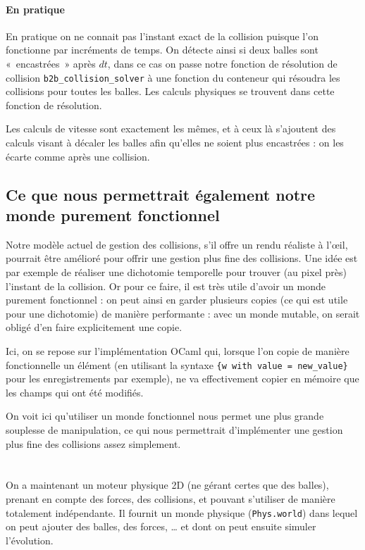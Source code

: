 \documentclass[a4paper]{scrartcl}
\begin{document}
\paragraph{En pratique}

En pratique on ne connait pas l'instant exact de la collision puisque
l'on fonctionne par incréments de temps. On détecte ainsi si deux
balles sont «~encastrées~» après $dt$, dans ce cas on passe notre
fonction de résolution de collision \texttt{b2b\_collision\_solver} à
une fonction du conteneur qui résoudra les collisions pour toutes les
balles. Les calculs physiques se trouvent dans cette fonction de
résolution.

Les calculs de vitesse sont exactement les mêmes, et à ceux là
s'ajoutent des calculs visant à décaler les balles afin qu'elles ne
soient plus encastrées : on les écarte comme après une collision.

\subsection{Ce que nous permettrait également notre monde purement
  fonctionnel}
Notre modèle actuel de gestion des collisions, s'il offre un rendu
réaliste à l'œil, pourrait être amélioré pour offrir une gestion plus
fine des collisions. Une idée est par exemple de réaliser une
dichotomie temporelle pour trouver (au pixel près) l'instant de la
collision. Or pour ce faire, il est très utile d'avoir un monde
purement fonctionnel : on peut ainsi en garder plusieurs copies (ce
qui est utile pour une dichotomie) de manière performante : avec un
monde mutable, on serait obligé d'en faire explicitement une copie.

Ici, on se repose sur l'implémentation OCaml qui, lorsque l'on copie
de manière fonctionnelle un élément (en utilisant la syntaxe
\texttt{\{w with value = new\_value\}} pour les enregistrements par
exemple), ne va effectivement copier en mémoire que les champs qui ont
été modifiés.

On voit ici qu'utiliser un monde fonctionnel nous permet une plus
grande souplesse de manipulation, ce qui nous permettrait
d'implémenter une gestion plus fine des collisions assez simplement.

\section*{}
On a maintenant un moteur physique 2D (ne gérant certes que des
balles), prenant en compte des forces, des collisions, et pouvant
s'utiliser de manière totalement indépendante. Il fournit un monde
physique (\texttt{Phys.world}) dans lequel on peut ajouter des balles,
des forces, … et dont on peut ensuite simuler l'évolution.
\end{document}
